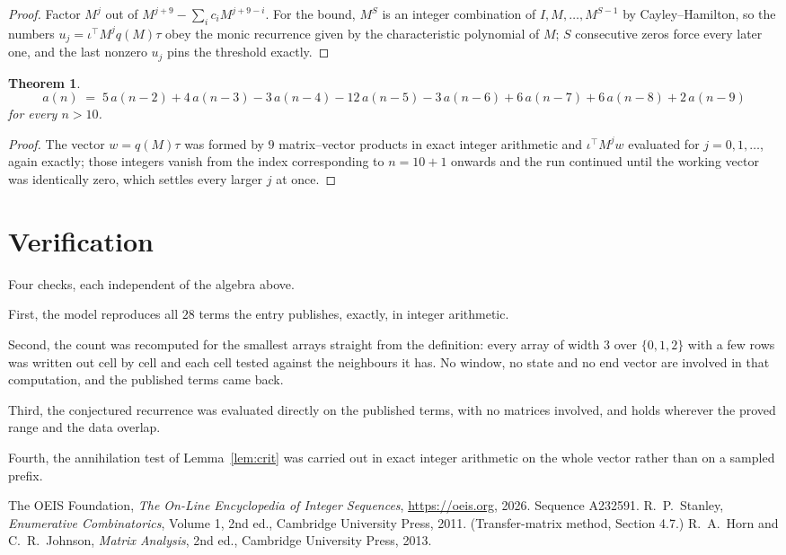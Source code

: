 \documentclass[11pt,a4paper]{article}
\theoremstyle{plain}
\newtheorem{theorem}{Theorem}
\theoremstyle{definition}
\begin{document}
\begin{proof}
Factor $M^{j}$ out of $M^{j+9}-\sum_ic_iM^{j+9-i}$. For the bound, $M^{S}$
is an integer combination of $I,M,\dots,M^{S-1}$ by Cayley--Hamilton, so the numbers
$u_j=\iota^{\!\top}M^{j}q(M)\tau$ obey the monic recurrence given by the characteristic
polynomial of $M$; $S$ consecutive zeros force every later one, and the last nonzero $u_j$
pins the threshold exactly.
\end{proof}

\begin{theorem}
\[
a(n)\;=\;5\,a(n-2) + 4\,a(n-3) - 3\,a(n-4) - 12\,a(n-5) - 3\,a(n-6) + 6\,a(n-7) + 6\,a(n-8) + 2\,a(n-9)
\]
for every $n>10$.
\end{theorem}

\begin{proof}
The vector $w=q(M)\tau$ was formed by $9$ matrix--vector products in exact integer
arithmetic and $\iota^{\!\top}M^{j}w$ evaluated for $j=0,1,\dots$, again exactly; those
integers vanish from the index corresponding to $n=10+1$ onwards and the run continued
until the working vector was identically zero, which settles every larger $j$ at once.
\end{proof}

\section{Verification}

Four checks, each independent of the algebra above.

First, the model reproduces all $28$ terms the entry publishes, exactly, in integer
arithmetic.

Second, the count was recomputed for the smallest arrays straight from the definition: every
array of width $3$ over $\{0,1,2\}$ with a few rows was written out cell by cell and each cell
tested against the neighbours it has. No window, no state and no end vector are involved in that
computation, and the published terms came back.

Third, the conjectured recurrence was evaluated directly on the published terms, with no
matrices involved, and holds wherever the proved range and the data overlap.

Fourth, the annihilation test of Lemma~\ref{lem:crit} was carried out in exact integer
arithmetic on the whole vector rather than on a sampled prefix.

\begin{thebibliography}{9}
 The OEIS Foundation, \emph{The On-Line Encyclopedia of Integer
Sequences}, \url{https://oeis.org}, 2026. Sequence A232591.
 R.~P.~Stanley, \emph{Enumerative Combinatorics}, Volume 1, 2nd ed.,
Cambridge University Press, 2011. (Transfer-matrix method, Section 4.7.)
 R.~A.~Horn and C.~R.~Johnson, \emph{Matrix Analysis}, 2nd ed., Cambridge
University Press, 2013.
\end{thebibliography}
\end{document}
